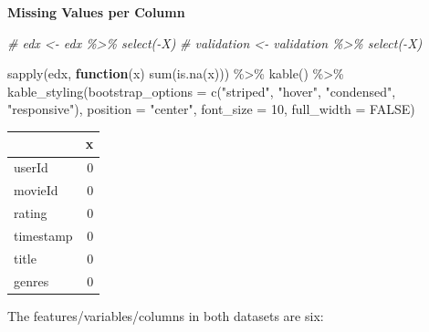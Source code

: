 \documentclass[
]{article}
\newenvironment{Shaded}{}{}
\newcommand{\AttributeTok}[1]{\textcolor[rgb]{0.49,0.56,0.16}{#1}}
\newcommand{\CommentTok}[1]{\textcolor[rgb]{0.38,0.63,0.69}{\textit{#1}}}
\newcommand{\ConstantTok}[1]{\textcolor[rgb]{0.53,0.00,0.00}{#1}}
\newcommand{\ControlFlowTok}[1]{\textcolor[rgb]{0.00,0.44,0.13}{\textbf{#1}}}
\newcommand{\DecValTok}[1]{\textcolor[rgb]{0.25,0.63,0.44}{#1}}
\newcommand{\FunctionTok}[1]{\textcolor[rgb]{0.02,0.16,0.49}{#1}}
\newcommand{\NormalTok}[1]{#1}
\newcommand{\SpecialCharTok}[1]{\textcolor[rgb]{0.25,0.44,0.63}{#1}}
\newcommand{\StringTok}[1]{\textcolor[rgb]{0.25,0.44,0.63}{#1}}
\begin{document}
\textbf{Missing Values per Column}

\begin{Shaded}
\begin{Highlighting}[]
\CommentTok{\# edx \textless{}{-} edx \%\textgreater{}\% select({-}X)}
\CommentTok{\# validation \textless{}{-} validation \%\textgreater{}\% select({-}X)}
\end{Highlighting}
\end{Shaded}

\begin{Shaded}
\begin{Highlighting}[]
\FunctionTok{sapply}\NormalTok{(edx, }\ControlFlowTok{function}\NormalTok{(x) }\FunctionTok{sum}\NormalTok{(}\FunctionTok{is.na}\NormalTok{(x))) }\SpecialCharTok{\%\textgreater{}\%} 
\FunctionTok{kable}\NormalTok{() }\SpecialCharTok{\%\textgreater{}\%}
   \FunctionTok{kable\_styling}\NormalTok{(}\AttributeTok{bootstrap\_options =} \FunctionTok{c}\NormalTok{(}\StringTok{"striped"}\NormalTok{, }\StringTok{"hover"}\NormalTok{, }\StringTok{"condensed"}\NormalTok{, }\StringTok{"responsive"}\NormalTok{),}
                 \AttributeTok{position =} \StringTok{"center"}\NormalTok{,}
                 \AttributeTok{font\_size =} \DecValTok{10}\NormalTok{,}
                 \AttributeTok{full\_width =} \ConstantTok{FALSE}\NormalTok{)}
\end{Highlighting}
\end{Shaded}

\begin{table}
\centering\begingroup\fontsize{10}{12}\selectfont

\begin{tabular}{l|r}
\hline
  & x\\
\hline
userId & 0\\
\hline
movieId & 0\\
\hline
rating & 0\\
\hline
timestamp & 0\\
\hline
title & 0\\
\hline
genres & 0\\
\hline
\end{tabular}
\endgroup{}
\end{table}

The features/variables/columns in both datasets are six:
\end{document}
